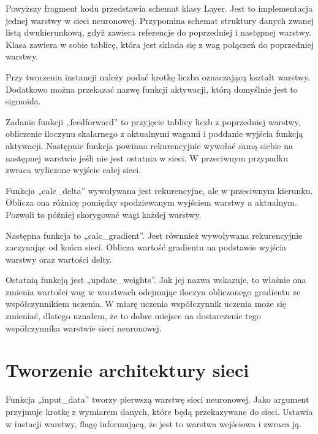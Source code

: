 
    Powyższy fragment kodu przedstawia schemat klasy Layer.
    Jest to implementacja jednej warstwy w sieci neuronowej.
    Przypomina schemat struktury danych zwanej listą dwukierunkową, gdyż zawiera referencje do poprzedniej i następnej warstwy.
    Klasa zawiera w sobie tablicę, która jest składa się z wag połączeń do poprzedniej warstwy.

    Przy tworzeniu instancji należy podać krotkę liczba oznaczającą kształt warstwy.
    Dodatkowo można przekazać nazwę funkcji aktywacji, którą domyślnie jest to sigmoida.

    Zadanie funkcji „feedforward” to przyjęcie tablicy liczb z poprzedniej warstwy, obliczenie iloczynu skalarnego z aktualnymi wagami i poddanie wyjścia funkcją aktywacji.
    Następnie funkcja powinna rekurencyjnie wywołać samą siebie na następnej warstwie jeśli nie jest ostatnia w sieci.
    W przeciwnym przypadku zwraca wyliczone wyjście całej sieci.

    Funkcja „calc\_delta” wywoływana jest rekurencyjne, ale w przeciwnym kierunku.
    Oblicza ona różnicę pomiędzy spodziewanym wyjściem warstwy a aktualnym.
    Pozwoli to później skorygować wagi każdej warstwy.

    Następna funkcja to „calc\_gradient”.
    Jest równnież wywoływana rekurencyjnie zaczynając od końca sieci.
    Oblicza wartość gradientu na podstawie wyjścia warstwy oraz wartości delty.

    Ostatnią funkcją jest „update\_weights”.
    Jak jej nazwa wskazuje, to właśnie ona zmienia wartości wag w warstwach odejmując iloczyn obliczonego gradientu ze współczynnikiem uczenia.
    W miarę uczenia współczynnik uczenia może się zmieniać, dlatego uznałem, że to dobre miejsce na dostarczenie tego współczynnika warstwie sieci neuronowej.

    \section{Tworzenie architektury sieci}\label{sec:tworzenieArchitekturySieci}


    Funkcja „input\_data” tworzy pierwszą warstwę sieci neuronowej.
    Jako argument przyjmuje krotkę z wymiarem danych, które będą przekazywane do sieci.
    Ustawia w instacji warstwy, flagę informującą, że jest to warstwa wejściowa i zwraca ją.

